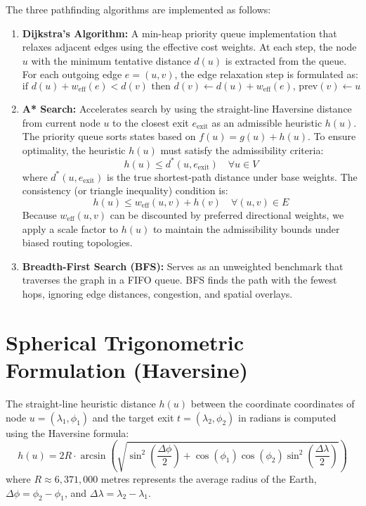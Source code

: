 \documentclass[12pt,a4paper,oneside]{report}
\begin{document}
The three pathfinding algorithms are implemented as follows:
\begin{enumerate}
    \item \textbf{Dijkstra's Algorithm:} A min-heap priority queue implementation that relaxes adjacent edges using the effective cost weights. At each step, the node $u$ with the minimum tentative distance $d(u)$ is extracted from the queue. For each outgoing edge $e = (u,v)$, the edge relaxation step is formulated as:
    \begin{equation}
    \text{if } d(u) + w_{\text{eff}}(e) < d(v) \text{ then } d(v) \leftarrow d(u) + w_{\text{eff}}(e), \, \text{prev}(v) \leftarrow u
    \label{eq:relaxation}
    \end{equation}
    
    \item \textbf{A* Search:} Accelerates search by using the straight-line Haversine distance from current node $u$ to the closest exit $e_{\text{exit}}$ as an admissible heuristic $h(u)$. The priority queue sorts states based on $f(u) = g(u) + h(u)$.
    To ensure optimality, the heuristic $h(u)$ must satisfy the admissibility criteria:
    \begin{equation}
    h(u) \le d^*(u, e_{\text{exit}}) \quad \forall u \in V
    \label{eq:admissibility}
    \end{equation}
    where $d^*(u, e_{\text{exit}})$ is the true shortest-path distance under base weights. The consistency (or triangle inequality) condition is:
    \begin{equation}
    h(u) \le w_{\text{eff}}(u, v) + h(v) \quad \forall (u, v) \in E
    \label{eq:consistency}
    \end{equation}
    Because $w_{\text{eff}}(u, v)$ can be discounted by preferred directional weights, we apply a scale factor to $h(u)$ to maintain the admissibility bounds under biased routing topologies.
    
    \item \textbf{Breadth-First Search (BFS):} Serves as an unweighted benchmark that traverses the graph in a FIFO queue. BFS finds the path with the fewest hops, ignoring edge distances, congestion, and spatial overlays.
\end{enumerate}

\section{Spherical Trigonometric Formulation (Haversine)}
The straight-line heuristic distance $h(u)$ between the coordinate coordinates of node $u = (\lambda_1, \phi_1)$ and the target exit $t = (\lambda_2, \phi_2)$ in radians is computed using the Haversine formula:
\begin{equation}
h(u) = 2R \cdot \arcsin\left(\sqrt{\sin^2\left(\frac{\Delta \phi}{2}\right) + \cos(\phi_1)\cos(\phi_2)\sin^2\left(\frac{\Delta \lambda}{2}\right)}\right)
\label{eq:haversine}
\end{equation}
where $R \approx 6,371,000$ metres represents the average radius of the Earth, $\Delta \phi = \phi_2 - \phi_1$, and $\Delta \lambda = \lambda_2 - \lambda_1$.
\end{document}
